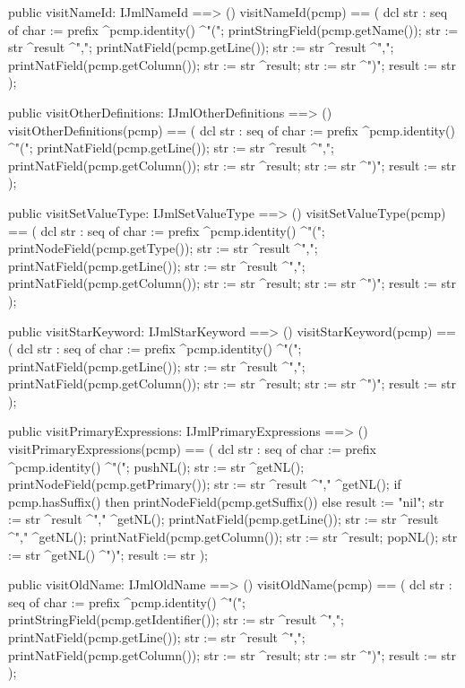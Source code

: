 \begin{vdm_al}
  public visitNameId: IJmlNameId ==> ()
  visitNameId(pcmp) ==
    ( dcl str : seq of char := prefix ^pcmp.identity() ^"(";
      printStringField(pcmp.getName());
      str := str ^result ^",";
      printNatField(pcmp.getLine());
      str := str ^result ^",";
      printNatField(pcmp.getColumn());
      str := str ^result;
      str := str ^")";
      result := str );

  public visitOtherDefinitions: IJmlOtherDefinitions ==> ()
  visitOtherDefinitions(pcmp) ==
    ( dcl str : seq of char := prefix ^pcmp.identity() ^"(";
      printNatField(pcmp.getLine());
      str := str ^result ^",";
      printNatField(pcmp.getColumn());
      str := str ^result;
      str := str ^")";
      result := str );

  public visitSetValueType: IJmlSetValueType ==> ()
  visitSetValueType(pcmp) ==
    ( dcl str : seq of char := prefix ^pcmp.identity() ^"(";
      printNodeField(pcmp.getType());
      str := str ^result ^",";
      printNatField(pcmp.getLine());
      str := str ^result ^",";
      printNatField(pcmp.getColumn());
      str := str ^result;
      str := str ^")";
      result := str );

  public visitStarKeyword: IJmlStarKeyword ==> ()
  visitStarKeyword(pcmp) ==
    ( dcl str : seq of char := prefix ^pcmp.identity() ^"(";
      printNatField(pcmp.getLine());
      str := str ^result ^",";
      printNatField(pcmp.getColumn());
      str := str ^result;
      str := str ^")";
      result := str );

  public visitPrimaryExpressions: IJmlPrimaryExpressions ==> ()
  visitPrimaryExpressions(pcmp) ==
    ( dcl str : seq of char := prefix ^pcmp.identity() ^"(";
      pushNL();
      str := str ^getNL();
      printNodeField(pcmp.getPrimary());
      str := str ^result ^"," ^getNL();
      if pcmp.hasSuffix()
      then printNodeField(pcmp.getSuffix())
      else result := "nil";
      str := str ^result ^"," ^getNL();
      printNatField(pcmp.getLine());
      str := str ^result ^"," ^getNL();
      printNatField(pcmp.getColumn());
      str := str ^result;
      popNL();
      str := str ^getNL() ^")";
      result := str );

  public visitOldName: IJmlOldName ==> ()
  visitOldName(pcmp) ==
    ( dcl str : seq of char := prefix ^pcmp.identity() ^"(";
      printStringField(pcmp.getIdentifier());
      str := str ^result ^",";
      printNatField(pcmp.getLine());
      str := str ^result ^",";
      printNatField(pcmp.getColumn());
      str := str ^result;
      str := str ^")";
      result := str );


\end{vdm_al}
